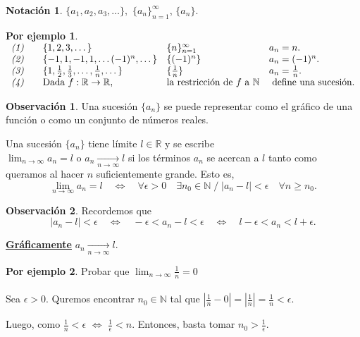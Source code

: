 \documentclass{article}
\theoremstyle{definition}
\theoremstyle{definition}
\newtheorem*{obs}{Observación}
\newtheorem*{ej}{Por ejemplo}
\newtheorem*{notacion}{Notación}
\theoremstyle{remark}
\begin{document}
\begin{notacion}
  $\{a_1,a_2,a_3, \dots \},$ $\{a_n\}_{n=1}^{\infty}$, $\{a_n\}$.
\end{notacion}
\begin{ej} \; \\
  $\begin{array}{lllll}

    \emph{(1)} &  & \{1,2,3, \dots \}& \{n\}_{n=1}^{\infty}& a_n=n.  \\

    \emph{(2)} &  & \{-1,1,-1,1, \dots (-1)^n, \dots \}&\{(-1)^n\}& a_n=(-1)^n. \\
    \emph{(3)} &  & \{1,\frac{1}{2},\frac{1}{3},\dots, \frac{1}{n},\dots\}& \{\frac{1}{n}\}& a_n=\frac{1}{n}.   \\
    \emph{(4)} &  & \text{Dada } f : \mathbb{R} \to \mathbb{R}, & \text{la restricción de $f$ a } \mathbb{N} & \text{ define una sucesión}.
  \end{array}$
\end{ej}
\begin{obs}
  Una sucesión $\{a_n\}$ se puede representar como el gráfico de una función o como un conjunto de números reales.

  \begin{figure}[h]
\centering
\def\svgwidth{0.75\textwidth}

\end{figure}
\end{obs}
\begin{defi}
  Una sucesión $\{a_n\}$ tiene límite $ l \in \mathbb{R} $ y se escribe \\
  $\lim_{n \to \infty}{a_n}=l$ o $a_n \underset{n \to \infty}{\longrightarrow} l$ si los términos $a_n$ se acercan a $l$ tanto como queramos al hacer $n$ suficientemente grande. Esto es,
  \[
    \lim_{n \to \infty } {a_n} = l\quad  \Longleftrightarrow \quad \forall \epsilon > 0\quad  \exists n_0 \in \mathbb{N} \;  / \;  |a_n - l| < \epsilon\quad  \forall n \geq n_0.
  \]
\end{defi}
\begin{obs}
    Recordemos que \[
      | a_n - l| < \epsilon \quad \Leftrightarrow \quad -\epsilon < a_n - l < \epsilon \quad \Leftrightarrow \quad l - \epsilon < a_n < l + \epsilon.
    \]
\end{obs}
\textbf{\underline{Gráficamente}}  $a_n \underset{n \to \infty}{\longrightarrow} l$.
\begin{figure}
\centering
\def\svgwidth{0.75\textwidth}

\end{figure}
\begin{ej}
  Probar que $\lim_{n \to \infty}{\frac{1}{n}}=0$ \\
  \\
  Sea $\epsilon > 0$. Quremos encontrar $n_0 \in \mathbb{N}$ tal que $\left\vert \frac{1}{n}-0\right\vert=\left\vert \frac{1}{n} \right\vert = \frac{1}{n} < \epsilon$.

  Luego, como $\frac{1}{n} < \epsilon$ $\Leftrightarrow$ $\frac{1}{\epsilon} < n$. Entonces, basta tomar $n_0 > \frac{1}{\epsilon}$.
\end{ej}
\end{document}
